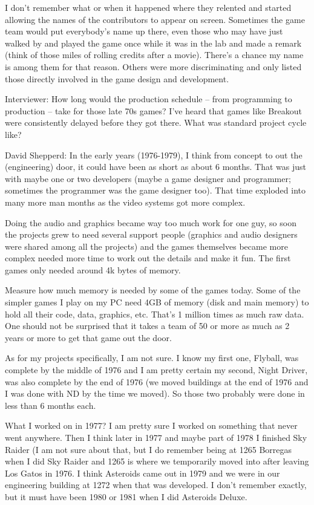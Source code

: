 I don't remember what or when it happened where they relented and started allowing the names of the contributors to appear on screen. Sometimes the game team would put everybody's name up there, even those who may have just walked by and played the game once while it was in the lab and made a remark (think of those miles of rolling credits after a movie). There's a chance my name is among them for that reason. Others were more discriminating and only listed those directly involved in the game design and development.

\textcolor{interviewer}{Interviewer:} How long would the production schedule – from programming to production – take for those late 70s games? I’ve heard that games like Breakout were consistently delayed before they got there. What was standard project cycle like?

\textcolor{interviewee}{David Shepperd:} In the early years (1976-1979), I think from concept to out the (engineering) door, it could have been as short as about 6 months. That was just with maybe one or two developers (maybe a game designer and programmer; sometimes the programmer was the game designer too). That time exploded into many more man months as the video systems got more complex. 

Doing the audio and graphics became way too much work for one guy, so soon the projects grew to need several support people (graphics and audio designers were shared among all the projects) and the games themselves became more complex needed more time to work out the details and make it fun. The first games only needed around 4k bytes of memory. 

Measure how much memory is needed by some of the games today. Some of the simpler games I play on my PC need 4GB of memory (disk and main memory) to hold all their code, data, graphics, etc. That's 1 million times as much raw data. One should not be surprised that it takes a team of 50 or more as much as 2 years or more to get that game out the door.

As for my projects specifically, I am not sure. I know my first one, Flyball, was complete by the middle of 1976 and I am pretty certain my second, Night Driver, was also complete by the end of 1976 (we moved buildings at the end of 1976 and I was done with ND by the time we moved). So those two probably were done in less than 6 months each. 

What I worked on in 1977? I am pretty sure I worked on something that never went anywhere. Then I think later in 1977 and maybe part of 1978 I finished Sky Raider (I am not sure about that, but I do remember being at 1265 Borregas when I did Sky Raider and 1265 is where we temporarily moved into after leaving Los Gatos in 1976. I think Asteroids came out in 1979 and we were in our engineering building at 1272 when that was developed. I don't remember exactly, but it must have been 1980 or 1981 when I did Asteroids Deluxe. 

